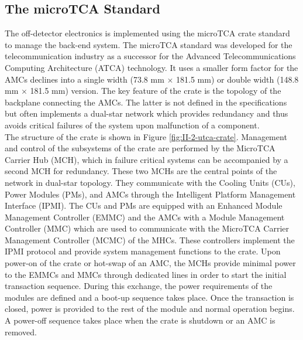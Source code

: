     \subsection{The microTCA Standard}

      The off-detector electronics is implemented using the microTCA crate standard to manage the back-end system. The microTCA standard was developed for the telecommunication industry as a successor for the Advanced Telecommunications Computing Architecture (ATCA) technology. It uses a smaller form factor for the AMCs declines into a single width (73.8 mm $ \times $ 181.5 mm) or double width (148.8 mm $ \times $ 181.5 mm) version. The key feature of the crate is the topology of the backplane connecting the AMCs. The latter is not defined in the specifications but often implements a dual-star network which provides redundancy and thus avoids critical failures of the system upon malfunction of a component. \\

      The structure of the crate is shown in Figure \ref{fig:II-2-utca-crate}. Management and control of the subsystems of the crate are performed by the MicroTCA Carrier Hub (MCH), which in failure critical systems can be accompanied by a second MCH for redundancy. These two MCHs are the central points of the network in dual-star topology. They communicate with the Cooling Units (CUs), Power Modules (PMs), and AMCs through the Intelligent Platform Management Interface (IPMI). The CUs and PMs are equipped with an Enhanced Module Management Controller (EMMC) and the AMCs with a Module Management Controller (MMC) which are used to communicate with the MicroTCA Carrier Management Controller (MCMC) of the MHCs. These controllers implement the IPMI protocol and provide system management functions to the crate. Upon power-on of the crate or hot-swap of an AMC, the MCHs provide minimal power to the EMMCs and MMCs through dedicated lines in order to start the initial transaction sequence. During this exchange, the power requirements of the modules are defined and a boot-up sequence takes place. Once the transaction is closed, power is provided to the rest of the module and normal operation begins. A power-off sequence takes place when the crate is shutdown or an AMC is removed. \\

